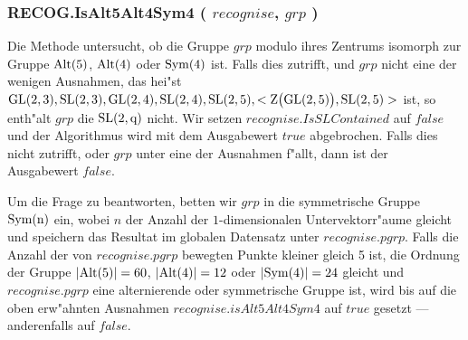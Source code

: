 \documentclass[a4paper,11pt]{article}
\theoremstyle{bla}
\begin{document}

\subsubsection{RECOG.IsAlt5Alt4Sym4 ( $recognise$, $grp$ )}\label{alt}

Die Methode untersucht, ob die Gruppe $grp$ modulo ihres Zentrums isomorph zur Gruppe $\rm{Alt}(5)$, $\rm{Alt}(4)$ oder $\rm{Sym}(4)$ ist. Falls dies zutrifft, und $grp$ nicht eine der wenigen Ausnahmen, das hei"st $\rm{GL}(2,3), \rm{SL}(2,3), \rm{GL}(2,4), \rm{SL}(2,4), \rm{SL}(2,5), <Z\bigl(\rm{GL}(2,5)\bigr),\rm{SL}(2,5)>$ ist, so enth"alt $grp$ die $\rm{SL}(2,q)$ nicht. Wir setzen $recognise.IsSLContained$ auf $false$ und der Algorithmus wird mit dem Ausgabewert $true$ abgebrochen. Falls dies nicht zutrifft, oder $grp$ unter eine der Ausnahmen f"allt, dann ist der Ausgabewert $false$.

Um die Frage zu beantworten, betten wir $grp$ in die symmetrische Gruppe $\rm{Sym}(n)$ ein, wobei $n$ der Anzahl der $1$-dimensionalen Untervektorr"aume gleicht und speichern das Resultat im globalen Datensatz unter $recognise.pgrp$. Falls die Anzahl der von $recognise.pgrp$ bewegten Punkte kleiner gleich 5 ist, die Ordnung der Gruppe $\vert \rm{Alt}(5) \vert = 60$, $\vert \rm{Alt}(4)\vert = 12 $ oder $\vert \rm{Sym}(4) \vert = 24$ gleicht und $recognise.pgrp$ eine alternierende oder symmetrische Gruppe ist, wird bis auf die oben erw"ahnten Ausnahmen $recognise.isAlt5Alt4Sym4$ auf $true$ gesetzt --- anderenfalls auf $false$.
\end{document}
